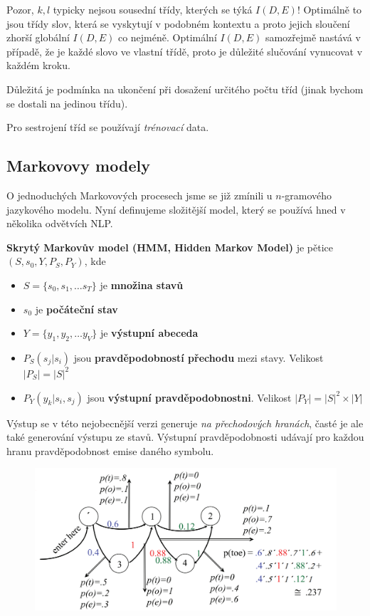\documentclass[11pt]{report} %
\numberwithin{equation}{section}
\begin{document}
Pozor, $k,l$ typicky nejsou sousední třídy, kterých se týká $I(D,E)$! Optimálně to jsou třídy slov, která se vyskytují v podobném kontextu a proto jejich sloučení zhorší globální $I(D,E)$ co nejméně. Optimální $I(D,E)$ samozřejmě nastává v případě, že je každé slovo ve vlastní třídě, proto je důležité slučování vynucovat v každém kroku.

Důležitá je podmínka na ukončení při dosažení určitého počtu tříd (jinak bychom se dostali na jedinou třídu). 

Pro sestrojení tříd se používají \textit{trénovací} data. 

\subsection{Markovovy modely}
O jednoduchých Markovových procesech jsme se již zmínili u $n$-gramového jazykového modelu. Nyní definujeme složitější model, který se používá hned v několika odvětvích NLP.

\textbf{Skrytý Markovův model (HMM, Hidden Markov Model)} je pětice $(S, s_0, Y, P_S, P_Y)$, kde
\begin{itemize}
	
	
	\item $S = \{s_0, s_1, \dots s_T\}$ je \textbf{množina stavů}
	\item $s_0$ je \textbf{počáteční stav}
	\item $Y = \{y_1,y_2,\dots y_V\}$ je \textbf{výstupní abeceda}
	\item $P_S(s_j|s_i)$ jsou \textbf{pravděpodobností přechodu} mezi stavy. Velikost $|P_S| = |S|^2$
	\item $P_Y(y_k|s_i,s_j)$ jsou \textbf{výstupní pravděpodobnostni}. Velikost $|P_Y| = |S|^2 \times |Y|$
\end{itemize}
Výstup se v této nejobecnější verzi generuje \textit{na přechodových hranách}, časté je ale také generování výstupu ze stavů. Výstupní pravděpodobnosti udávají pro každou hranu pravděpodobnost emise daného symbolu.
\begin{figure}[H]
	\centering
	\includegraphics[scale=1]{img/hmm.png}
\end{figure}
\end{document}
